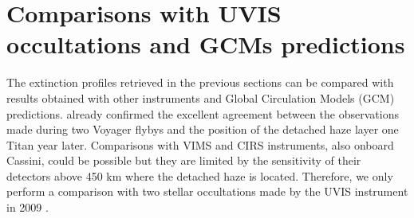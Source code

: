 \section{Comparisons with UVIS occultations and GCMs predictions}

The extinction profiles retrieved in the previous sections can be compared with results
obtained with other instruments and Global Circulation Models (GCM) predictions.
\cite{West2018} already confirmed the excellent agreement between the observations made during
two Voyager flybys and the position of the detached haze layer one Titan year later.
Comparisons with VIMS and CIRS instruments, also onboard Cassini, could be possible but
they are limited by the sensitivity of their detectors above 450 km where the detached haze is located.
Therefore, we only perform a comparison with two stellar occultations
made by the UVIS instrument in 2009 \citep{Koskinen2011}.


